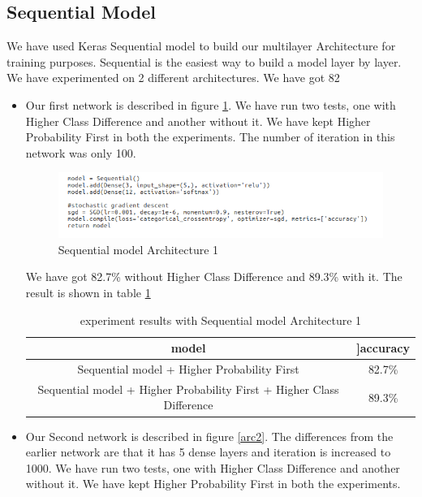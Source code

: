 \documentclass{standalone}
\begin{document}
\subsection{Sequential Model} We have used Keras Sequential model\cite{Charles2013} to build our multilayer Architecture for training purposes. Sequential is the easiest way to build a model layer by layer. We have experimented on 2 different architectures. We have got 82
\begin{itemize}
    \item Our first network is described in figure \ref{arc1}. We have run two tests, one with Higher Class Difference and another without it. We have kept Higher Probability First in both the experiments. The number of iteration in this network was only 100.

        \begin{figure}[h!]
        \centering
        \includegraphics[width=1.0\columnwidth]{img/model1.png}
        \caption{Sequential model Architecture 1}
        \label{arc1}
        \end{figure}
        We have got 82.7\% without Higher Class Difference and 89.3\% with it. The result is shown in table \ref{res2}
        \begin{table}[h!]
        \centering
        \begin{tabular}{|c|c|}
            \hline
            \textbf{model} & ]\textbf{accuracy} \\ [1ex]
            \hline
            Sequential model + Higher Probability First & 82.7\%\\
            \hline
            Sequential model + Higher Probability First + Higher Class
            Difference & 89.3\%  \\ 
            \hline
        \end{tabular}
        \caption{experiment results with Sequential model Architecture 1}
        \label{res2}
    \end{table}
    \item Our Second network is described in figure \ref{arc2}. The differences from the earlier network are that it has 5 dense layers and iteration is increased to 1000. We have run two tests, one with Higher Class Difference and another without it. We have kept Higher Probability First in both the experiments. 


\end{itemize}
\end{document}
